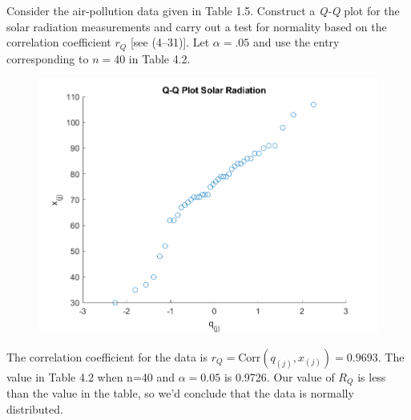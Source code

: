 Consider the air-pollution data given in Table 1.5. Construct a \textit{Q-Q} plot for the solar
radiation measurements and carry out a test for normality based on the correlation
coefficient $r_{Q}$ [see (4--31)]. Let $\alpha = .05$ and use the entry corresponding to $n = 40$ in Table 4.2.

\begin{figure}[H]
    \includegraphics[scale=0.8]{./matlab/chapter-4/sol4.28.png}
\end{figure}

The correlation coefficient for the data is $r_{Q} = \text{Corr}(q_{(j)}, x_{(j)}) = 0.9693$. The value in Table 4.2 when n=40 and $\alpha = 0.05$ is 0.9726. Our value of $R_{Q}$ is less than the value in the table, so we'd conclude that the data is normally distributed.